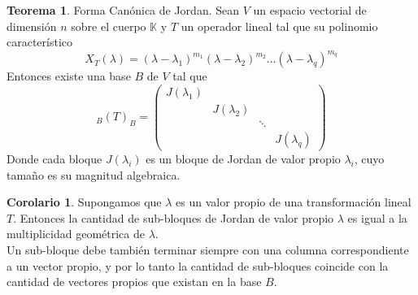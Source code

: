 \documentclass[10pt]{article}
\theoremstyle{definition}
\newtheorem{theorem}{Teorema}[section]
\newtheorem{corollary}{Corolario}[theorem]
\begin{document}
\begin{theorem}{Forma Canónica de Jordan.}
	Sean $V$ un espacio vectorial de dimensión $n$ sobre el cuerpo $\mathbb{K}$ y $T$ un operador lineal tal que su polinomio característico $$X_T(\lambda)=(\lambda - \lambda _1)^{m_1}(\lambda -\lambda _2)^{m_2}\dots (\lambda - \lambda _q)^{m_q}$$
	Entonces existe una base $B$ de $V$ tal que
	$$_B(T)_B=\begin{pmatrix}
			J(\lambda _1) &               &        &               \\
			              & J(\lambda _2) &        &               \\
			              &               & \ddots &               \\
			              &               &        & J(\lambda _q)
		\end{pmatrix}$$
	Donde cada bloque $J(\lambda _i)$ es un bloque de Jordan de valor propio $\lambda _i$, cuyo tamaño es su magnitud algebraica.
\end{theorem}
\begin{corollary}
	Supongamos que $\lambda$ es un valor propio de una transformación lineal $T$. Entonces la cantidad de sub-bloques de Jordan de valor propio $\lambda$ es igual a  la multiplicidad geométrica de $\lambda$.\\
	Un sub-bloque debe también terminar siempre con una columna correspondiente a un vector propio, y por lo tanto la cantidad de sub-bloques coincide con la cantidad de vectores propios que existan en la base $B$.
\end{corollary}
\end{document}
